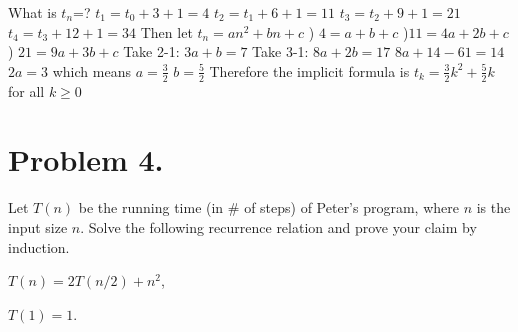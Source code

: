 \documentclass[11pt]{article}
\begin{document}
What is $t_n$=?
\newline
\newline
$t_{1} = t_{0} + 3 + 1 = 4$
\newline
$t_{2} = t_{1} + 6 + 1 = 11$
\newline
$t_{3} = t_{2} + 9 + 1 = 21$
\newline
$t_{4} = t_{3} + 12 + 1 = 34$
\newline
\newline
Then let $t_{n} = an^2+bn+c$
) $4 = a + b + c$ 
)$11 = 4a + 2b +c$ 
) $21 = 9a +3b +c$ 
\newline
Take 2-1: $3a + b = 7$
\newline
Take 3-1: $8a + 2b = 17$
\newline
$8a + 14 - 61 = 14$
\newline
\newline
$2a = 3$ which means $a = \frac{3}{2}$
\newline
$b = \frac{5}{2}$
\newline
Therefore the implicit formula is $t_{k} = \frac{3}{2}k^2+\frac{5}{2}k $ for all $k \geq 0$




\newpage

\noindent
\section*{Problem 4.}

Let $T(n)$ be the running time (in \# of steps) of Peter's program, where $n$ is the input size $n$.
Solve the following recurrence relation and prove your claim by induction.
\newline

$T(n)=2T(n/2)+n^2$,

$T(1)=1$.
\newline

\end{document}
